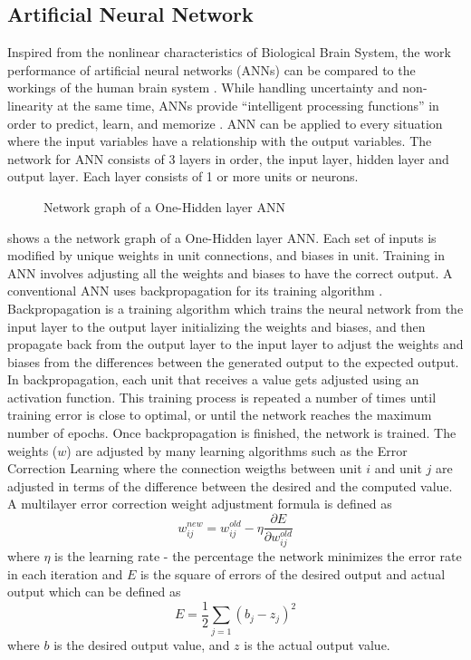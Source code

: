 \subsection{Artificial Neural Network}
Inspired from the nonlinear characteristics of Biological Brain System, the work performance of artificial neural networks (ANNs) can be compared to the workings of the human brain system . While handling uncertainty and non-linearity at the same time, ANNs provide “intelligent processing functions” in order to predict, learn, and memorize . 
ANN can be applied to every situation where the input variables have a relationship with the output variables. The network for ANN consists of 3 layers in order, the input layer, hidden layer and output layer. Each layer consists of 1 or more units or neurons. 
\begin{figure}[h]
	\centering
	\captionsetup{justification=centering}
	\caption{Network graph of a One-Hidden layer ANN}
	\label{fig:annexample}
\end{figure}

 shows a the network graph of a One-Hidden layer ANN. Each set of inputs is modified by unique weights in unit connections, and biases in unit. Training in ANN involves adjusting all the weights and biases to have the correct output. A conventional ANN uses backpropagation for its training algorithm . Backpropagation is a training algorithm which trains the neural network from the input layer to the output layer initializing the weights and biases, and then propagate back from the output layer to the input layer to adjust the weights and biases from the differences between the generated output to the expected output. In backpropagation, each unit that receives a value gets adjusted using an activation function. This training process is repeated a number of times until training error is close to optimal, or until the network reaches the maximum number of epochs. Once backpropagation is finished, the network is trained. The weights ($w$) are adjusted by many learning algorithms such as the Error Correction Learning where the connection weigths between unit $i$ and unit $j$ are adjusted in terms of the difference between the desired and the computed value. A multilayer error correction weight adjustment formula is defined as 
\begin{equation}
w_{ij}^{new} = w_{ij}^{old} - \eta \frac{\partial  E}{\partial  w_{ij}^{old}}
\end{equation}
\noindent where $\eta$ is the learning rate - the percentage the network minimizes the error rate in each iteration and $E$ is the square of errors of the desired output and actual output which can be defined as 
\begin{equation}
E = \frac{1}{2} \sum_{j=1} \left(b_{j} - z_j\right)^2
\end{equation}
\noindent where $b$ is the desired output value, and $z$ is the actual output value.


